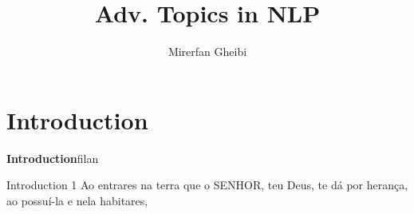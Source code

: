 \documentclass{beamer}
\author{Mirerfan Gheibi}
\institute{Dalhousie University}
\title{Adv. Topics in NLP}
\begin{document}
\begin{frame}
\titlepage
\end{frame}

\section{Introduction}

\begin{frame}{\textbf{Introduction}}{filan}\pause


 \begin{block}{Introduction}
1 Ao entrares na terra que o SENHOR, teu Deus, te dá por herança, ao possuí-la e nela habitares,
 \end{block}
\end{frame}
\end{document}

